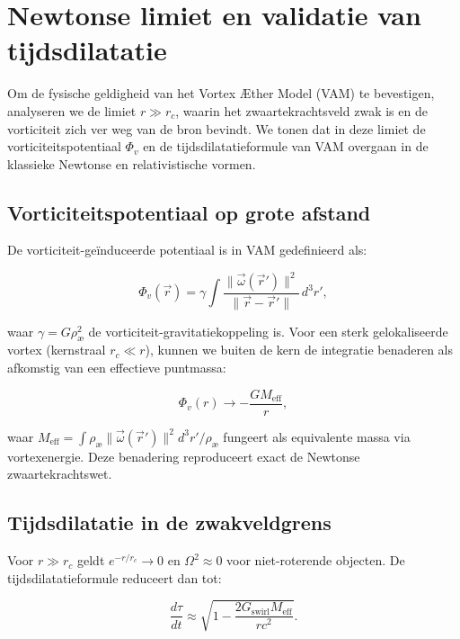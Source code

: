 
\section{Newtonse limiet en validatie van tijdsdilatatie}

Om de fysische geldigheid van het Vortex Æther Model (VAM) te bevestigen, analyseren we de limiet $r \gg r_c$, waarin het zwaartekrachtsveld zwak is en de vorticiteit zich ver weg van de bron bevindt. We tonen dat in deze limiet de vorticiteitspotentiaal $\Phi_v$ en de tijdsdilatatieformule van VAM overgaan in de klassieke Newtonse en relativistische vormen.

\subsection{Vorticiteitspotentiaal op grote afstand}

De vorticiteit-geïnduceerde potentiaal is in VAM gedefinieerd als:

\begin{equation}
\Phi_v(\vec{r}) = \gamma \int \frac{\|\vec{\omega}(\vec{r}')\|^2}{\|\vec{r} - \vec{r}'\|} \, d^3r',
\end{equation}

waar $\gamma = G \rho_\text{æ}^2$ de vorticiteit-gravitatiekoppeling is. Voor een sterk gelokaliseerde vortex (kernstraal $r_c \ll r$), kunnen we buiten de kern de integratie benaderen als afkomstig van een effectieve puntmassa:

\begin{equation}
\Phi_v(r) \to -\frac{G M_{\text{eff}}}{r},
\end{equation}

waar $M_{\text{eff}} = \int \rho_\text{æ} \|\vec{\omega}(\vec{r}')\|^2 d^3r' / \rho_\text{æ}$ fungeert als equivalente massa via vortexenergie. Deze benadering reproduceert exact de Newtonse zwaartekrachtswet.

\subsection{Tijdsdilatatie in de zwakveldgrens}

Voor $r \gg r_c$ geldt $e^{-r/r_c} \to 0$ en $\Omega^2 \approx 0$ voor niet-roterende objecten. De tijdsdilatatieformule reduceert dan tot:

\begin{equation}
\frac{d\tau}{dt} \approx \sqrt{1 - \frac{2 G_{\text{swirl}} M_{\text{eff}}}{r c^2}}.
\end{equation}


